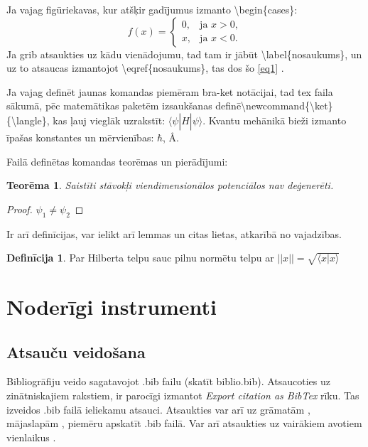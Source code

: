 \documentclass[12pt]{report}%
\newcommand{\bra}{\langle}
\newcommand{\ket}{\rangle}
\newtheorem{theorem}{Teorēma}
\theoremstyle{definition}
\newtheorem{definition}{Definīcija}
\newcommand*{\SavedEqref}{}%
\let\SavedEqref\eqref
\renewcommand*{\eqref}[1]{%
  \begingroup
    \hypersetup{
      linkcolor=blue,
      linkbordercolor=black,
    }%
    \SavedEqref{#1}%
  \endgroup
}%
\begin{document}
Ja vajag figūriekavas, kur atšķir gadījumus izmanto \textbackslash begin\{cases\}:
\begin{equation}
    f(x)=\begin{cases}
0,& \text{ja $x>0$},\\
x, &
\text{ja $x<0$}.
\end{cases}
\end{equation}
Ja grib atsaukties uz kādu vienādojumu, tad tam ir jābūt \textbackslash label\{nosaukums\}, un uz to atsaucas izmantojot \textbackslash eqref\{nosaukums\}, tas dos šo \eqref{eq1}.


Ja vajag definēt jaunas komandas piemēram bra-ket notācijai, tad tex faila sākumā, pēc matemātikas paketēm izsaukšanas definē\newline \textbackslash newcommand\{\textbackslash ket\}\{\textbackslash langle\}, kas ļauj vieglāk uzrakstīt: $\bra\psi|\hat{H}|\psi\ket$. Kvantu mehānikā bieži izmanto īpašas konstantes un mērvienības: $\hbar$, \AA. 

Failā definētas komandas teorēmas un pierādījumi:
\begin{theorem}
Saistīti stāvokļi viendimensionālos potenciālos nav deģenerēti.
\end{theorem}
\begin{proof}
$\psi_1\neq \psi_2$
\end{proof}
Ir arī definīcijas, var ielikt arī lemmas un citas lietas, atkarībā no vajadzības.
\begin{definition}
Par Hilberta telpu sauc pilnu normētu telpu ar $||x|| = \sqrt{\bra x|x\ket}$
\end{definition}
\section{Noderīgi instrumenti}
\subsection{Atsauču veidošana}
Bibliogrāfiju veido sagatavojot .bib failu (skatīt biblio.bib).
Atsaucoties uz zinātniskajiem rakstiem, ir parocīgi izmantot \textit{Export citation as BibTex} rīku. Tas izveidos .bib failā ieliekamu atsauci. Atsaukties var arī uz grāmatām \cite{dirac}, mājaslapām \cite{Algorithm}, piemēru apskatīt .bib failā. Var arī atsaukties uz vairākiem avotiem vienlaikus \cite{Algorithm, AlgorithmLV}.
\end{document}
